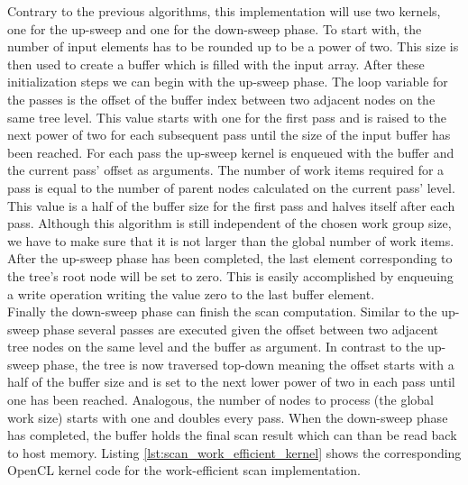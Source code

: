 

Contrary to the previous algorithms, this implementation will use two kernels, one for the up-sweep and one for the down-sweep phase. 
To start with, the number of input elements has to be rounded up to be a power of two. This size is then used to create a buffer which is filled with the input array.
After these initialization steps we can begin with the up-sweep phase. The loop variable for the passes is the offset of the buffer index between two adjacent nodes on the same tree level. This value starts with one for the first pass and is raised to the next power of two for each subsequent pass until the size of the input buffer has been reached. For each pass the up-sweep kernel is enqueued with the buffer and the current pass' offset as arguments. The number of work items required for a pass is equal to the number of parent nodes calculated on the current pass' level. This value is a half of the buffer size for the first pass and halves itself after each pass. Although this algorithm is still independent of the chosen work group size, we have to make sure that it is not larger than the global number of work items. \\
After the up-sweep phase has been completed, the last element corresponding to the tree's root node will be set to zero. This is easily accomplished by enqueuing a write operation writing the value zero to the last buffer element. \\
Finally the down-sweep phase can finish the scan computation. Similar to the up-sweep phase several passes are executed given the offset between two adjacent tree nodes on the same level and the buffer as argument. In contrast to the up-sweep phase, the tree is now traversed top-down meaning the offset starts with a half of the buffer size and is set to the next lower power of two in each pass until one has been reached. Analogous, the number of nodes to process (the global work size) starts with one and doubles every pass.
When the down-sweep phase has completed, the buffer holds the final scan result which can than be read back to host memory.
Listing \ref{lst:scan_work_efficient_kernel} shows the corresponding OpenCL kernel code for the work-efficient scan implementation.



